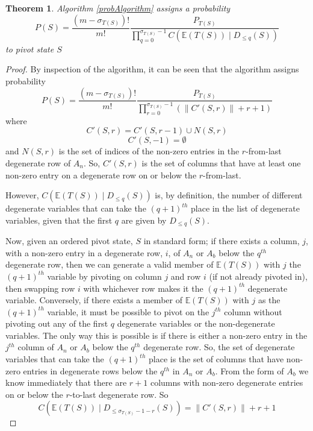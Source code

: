 \documentclass{article}
\newtheorem{theorem}{Theorem}
\begin{document}
\begin{theorem}
Algorithm \ref{probAlgorithm} assigns a probability
\[
P(S) =  \frac{(m-\sigma_{T(S)})!}{m!} \frac{P_{T(S)}}{\prod_{q=0}^{\sigma_{T(S)}-1} C(\mathbb{E}(T(S)) \mid D_{\le q}(S))}
\]
to pivot state $S$
\end{theorem}
\begin{proof}
By inspection of the algorithm, it can be seen that the algorithm assigns probability 
\[
P(S) =  \frac{(m-\sigma_{T(S)})!}{m!} \frac{P_{T(S)}}{\prod_{r=0}^{\sigma_{T(S)}-1} \left(\left\|C'(S, r)\right\| + r + 1\right)}
\]
where
\[
C'(S,r) = C'(S,r-1) \cup N(S,r)
\]
\[
C'(S,-1) = \emptyset
\]
and $N(S,r)$ is the set of indices of the non-zero entries in the $r$-from-last degenerate row of $A_n$. So, $C'(S,r)$ is the set of columns that have at least one non-zero entry on a degenerate row on or below the $r$-from-last.

However, $C(\mathbb{E}(T(S)) \mid D_{\le q}(S))$ is, by definition, the number of different degenerate variables that can take the $(q+1)^{th}$ place in the list of degenerate variables, given that the first $q$ are given by $D_{\le q}(S)$.

Now, given an ordered pivot state, $S$ in standard form; if there exists a column, $j$, with a non-zero entry in a degenerate row, $i$,  of $A_n$ or $A_b$ below the $q^{th}$ degenerate row, then we can generate a valid member of $\mathbb{E}(T(S))$ with $j$ the $(q+1)^{th}$ variable by pivoting on column $j$ and row $i$ (if not already pivoted in), then swapping row $i$ with whichever row makes it the $(q+1)^{th}$ degenerate variable. Conversely, if there exists a member of $\mathbb{E}(T(S))$ with $j$ as the $(q+1)^{th}$ variable, it must be possible to pivot on the $j^{th}$ column without pivoting out any of the first $q$ degenerate variables or the non-degenerate variables. The only way this is possible is if there is either a non-zero entry in the $j^{th}$ column of $A_n$ or $A_b$ below the $q^{th}$ degenerate row. So, the set of degenerate variables that can take the $(q+1)^{th}$ place is the set of columns that have non-zero entries in degenerate rows below the $q^{th}$ in $A_n$ or $A_b$. From the form of $A_b$ we know immediately that there are $r+1$ columns with non-zero degenerate entries on or below the $r$-to-last degenerate row. So
\[
C(\mathbb{E}(T(S)) \mid D_{\le \sigma_{T(S)} -1 - r}(S)) = \left\|C'(S, r)\right\| + r + 1
\]


\end{proof}
\end{document}
